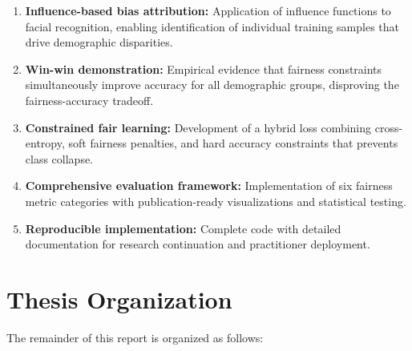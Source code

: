 \documentclass[11pt,a4paper,oneside]{report}
\begin{document}
\begin{enumerate}

\item \textbf{Influence-based bias attribution:} Application of influence functions to facial recognition, enabling identification of individual training samples that drive demographic disparities.

\item \textbf{Win-win demonstration:} Empirical evidence that fairness constraints simultaneously improve accuracy for all demographic groups, disproving the fairness-accuracy tradeoff.

\item \textbf{Constrained fair learning:} Development of a hybrid loss combining cross-entropy, soft fairness penalties, and hard accuracy constraints that prevents class collapse.

\item \textbf{Comprehensive evaluation framework:} Implementation of six fairness metric categories with publication-ready visualizations and statistical testing.

\item \textbf{Reproducible implementation:} Complete code with detailed documentation for research continuation and practitioner deployment.

\end{enumerate}

\section{Thesis Organization}

The remainder of this report is organized as follows:
\end{document}
